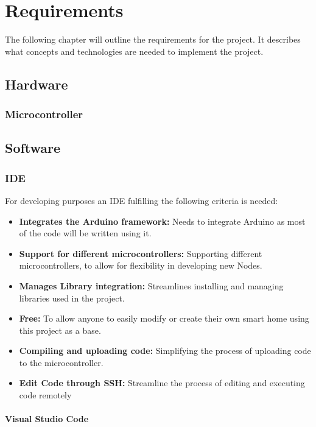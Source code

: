 \chapter{Requirements} 
The following chapter will outline the requirements for the 
project. It describes what concepts and technologies are needed
to implement the project.
    \section{Hardware}
        \subsection{Microcontroller}

    \section{Software}
        \subsection{IDE}
        For developing purposes an IDE fulfilling the following criteria is needed:
        \begin{itemize}[itemsep=0em]
            \item \textbf{Integrates the Arduino framework:}
            Needs to integrate Arduino as most of the code will be written using it.
            \item \textbf{Support for different microcontrollers:}
            Supporting different microcontrollers, to allow for flexibility
            in developing new Nodes.
            \item \textbf{Manages Library integration:}
            Streamlines installing and managing libraries used in the project.
            \item \textbf{Free:}
            To allow anyone to easily modify  or create their own smart home
            using this project as a base.
            \item \textbf{Compiling and uploading code:} 
            Simplifying the process of uploading code to the microcontroller.
            \item \textbf{Edit Code through SSH:}
            Streamline the process of editing and executing code remotely
        \end{itemize} 

            \subsubsection{Visual Studio Code}
